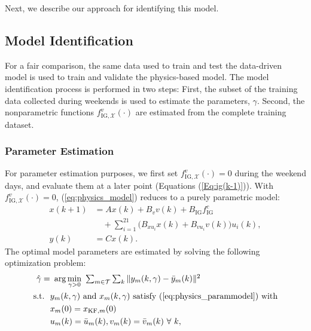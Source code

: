 Next, we describe our approach for identifying this model.

\subsection{Model Identification}\label{sec:physics_id}

For a fair comparison, the same data used to train and test the data-driven model is used to train and validate the physics-based model. 
The model identification process is performed in two steps: First, the subset of the training data collected during weekends is used to estimate the parameters, $\gamma$. Second, the nonparametric functions $f_{\text{IG},\mathcal{X}}^v(\cdot)$ are estimated from the complete training dataset.

\vspace*{0.2cm}
\subsubsection{Parameter Estimation}
For parameter estimation purposes, we first set $f_{\text{IG},\mathcal{X}}^v(\cdot) = 0$ during the weekend days, and evaluate them at a later point (Equations (\ref{Eq:ig(k-1)})). With $f_{\text{IG},\mathcal{X}}^v(\cdot) = 0$, (\ref{eq:physics_model}) reduces to a purely parametric model:
\begin{equation}\label{eq:physics_parammodel}
\begin{aligned}
x(k+1) &= Ax(k)+B_v v(k) + B_\text{IG} f_\text{IG}^c\\
	& \quad + \textstyle \sum_{i=1}^{21} \big( B_{xu_i} x(k) + B_{vu_i} v(k) \big) u_i(k), \\
y(k) &= C x(k).
\end{aligned}
\end{equation}
The optimal model parameters are estimated by solving the following optimization problem:
\begin{equation}\label{eq:physics_opt}
\begin{aligned}
 \hat{\gamma} =&~\arg\min_{\gamma > 0}~\textstyle \sum_{m \in \mathcal{T}} \sum_k \Vert y_m(k,\gamma) - \bar y_m(k) \Vert ^ 2 \\
\text{s.t.~~}
&y_m(k,\gamma) \text{~and~} x_m(k,\gamma) \text{~satisfy (\ref{eq:physics_parammodel}) with}\\
&x_m(0) = x_{\text{KF},m}(0)\\
&u_m(k) = \bar u_m(k), v_m(k) = \bar v_m(k)~\forall~k,\\
\end{aligned}
\end{equation}

